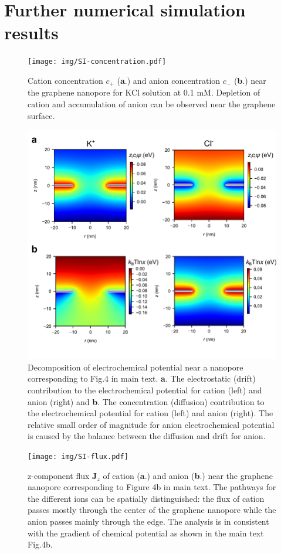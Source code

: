 \documentclass[manuscript=suppinfo,email=true, hyperref=true, keywords=false]{achemso}
\newcommand{\Fig}{Fig.}
\begin{document}
\iffalse
\section{Further numerical simulation results}
\label{sec:simu-res}

\begin{figure}[htbp]
  \centering
  \texttt{[image: img/SI-concentration.pdf]}
  \caption{Cation concentration $c_{+}$ (\textbf{a}.) and anion
    concentration $c_{-}$ (\textbf{b}.) near the graphene nanopore for
    KCl solution at 0.1 mM. Depletion of cation and accumulation of
    anion can be observed near the graphene surface.}
  \label{fig:conc}
\end{figure}

\begin{figure}[htbp]
  \centering
  \includegraphics[width=0.8\linewidth]{img/SI-electrochemical-decomposite.pdf}
  \caption{Decomposition of electrochemical potential near a nanopore
    corresponding to \Fig 4 in main text. \textbf{a}. The electrostatic
    (drift) contribution to the electrochemical potential for cation
    (left) and anion (right) and \textbf{b}. The concentration (diffusion)
    contribution to the electrochemical potential for cation (left)
    and anion (right). The relative small order of magnitude for anion
    electrochemical potential is caused by the balance between the
    diffusion and drift for anion.}
  \label{fig:potential}
\end{figure}

\begin{figure}[htbp]
  \centering
  \texttt{[image: img/SI-flux.pdf]}
  \caption{z-component flux $\boldsymbol{J}_{z}$ of cation
    (\textbf{a}.)  and anion (\textbf{b}.) near the graphene nanopore
    corresponding to Figure 4b in main text. The pathways for the
    different ions can be spatially distinguished: the flux of cation
    passes mostly through the center of the graphene nanopore while
    the anion passes mainly through the edge. The analysis is in
    consistent with the gradient of chemical potential as shown in the
    main text \Fig 4b.}
  \label{fig:flux}
\end{figure}
\end{document}
